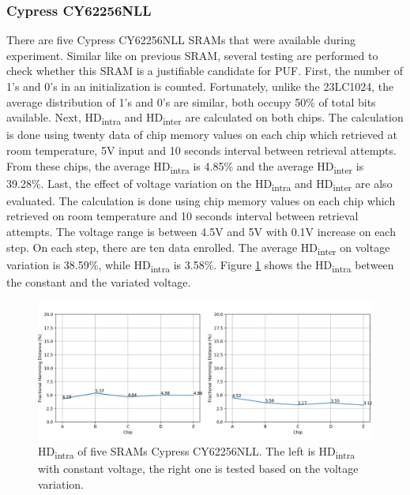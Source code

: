 \subsubsection{Cypress CY62256NLL}

There are five Cypress CY62256NLL SRAMs that were available during experiment. Similar like on previous SRAM, several testing are performed to check whether this SRAM is a justifiable candidate for PUF.
First, the number of 1's and 0's in an initialization is counted. Fortunately, unlike the 23LC1024, the average distribution of 1's and 0's are similar, both occupy 50\% of total bits available.
Next,
HD\textsubscript{intra} and HD\textsubscript{inter} are calculated on both chips. The calculation is done using twenty data of chip memory values on each chip which retrieved at room temperature, 5V input and 10 seconds interval between retrieval attempts.
From these chips, the average HD\textsubscript{intra} is 4.85\% and the average HD\textsubscript{inter} is 39.28\%.
Last, the effect of voltage variation on the HD\textsubscript{intra} and HD\textsubscript{inter} are also evaluated. The calculation is done using chip memory values on each chip which retrieved on room temperature and 10 seconds interval between retrieval attempts. The voltage range is between 4.5V and 5V with 0.1V increase on each step. On each step, there are ten data enrolled.
The average HD\textsubscript{inter} on voltage variation is 38.59\%, while HD\textsubscript{intra} is 3.58\%. Figure \ref{fig:cy62256nll_hd_intra} shows the HD\textsubscript{intra} between the constant and the variated voltage.

\begin{figure}[tph!]
    \centerline{\includegraphics[width={\textwidth}]{images/cy62256nll_hd_intra}}
    \caption{HD\textsubscript{intra} of five SRAMs Cypress CY62256NLL. The left is HD\textsubscript{intra} with constant voltage, the right one is tested based on the voltage variation.}
    \label{fig:cy62256nll_hd_intra}
\end{figure}

